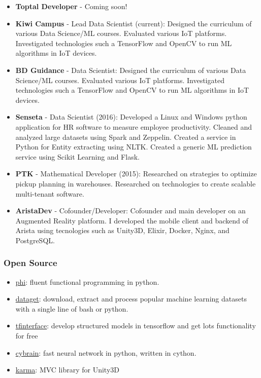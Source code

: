 \documentclass[]{article}
\begin{document}
\begin{itemize}
\itemsep1pt\parskip0pt
\item
  \textbf{Toptal Developer} - Coming soon!
\item
  \textbf{Kiwi Campus} - Lead Data Scientist (current): Designed the
  curriculum of various Data Science/ML courses. Evaluated various IoT
  platforms. Investigated technologies such a TensorFlow and OpenCV to
  run ML algorithms in IoT devices.
\item
  \textbf{BD Guidance} - Data Scientist: Designed the curriculum of
  various Data Science/ML courses. Evaluated various IoT platforms.
  Investigated technologies such a TensorFlow and OpenCV to run ML
  algorithms in IoT devices.
\item
  \textbf{Senseta} - Data Scientist (2016): Developed a Linux and
  Windows python application for HR software to measure employee
  productivity. Cleaned and analyzed large datasets using Spark and
  Zeppelin. Created a service in Python for Entity extracting using
  NLTK. Created a generic ML prediction service using Scikit Learning
  and Flask.
\item
  \textbf{PTK} - Mathematical Developer (2015): Researched on strategies
  to optimize pickup planning in warehouses. Researched on technologies
  to create scalable multi-tenant software.
\item
  \textbf{AristaDev} - Cofounder/Developer: Cofounder and main developer
  on an Augmented Reality platform. I developed the mobile client and
  backend of Arista using tecnologies such as Unity3D, Elixir, Docker,
  Nginx, and PostgreSQL.
\end{itemize}

\subsubsection{Open Source}\label{open-source}

\begin{itemize}
\itemsep1pt\parskip0pt
\item
  \href{https://github.com/cgarciae/phi}{phi}: fluent functional
  programming in python.
\item
  \href{https://github.com/cgarciae/dataget}{dataget}: download, extract
  and process popular machine learning datasets with a single line of
  bash or python.
\item
  \href{https://github.com/cgarciae/tfinterface}{tfinterface}: develop
  structured models in tensorflow and get lots functionality for free
\item
  \href{https://github.com/cgarciae/cybrain}{cybrain}: fast neural
  network in python, written in cython.
\item
  \href{https://github.com/cgarciae/karma}{karma}: MVC library for
  Unity3D
\end{itemize}
\end{document}
